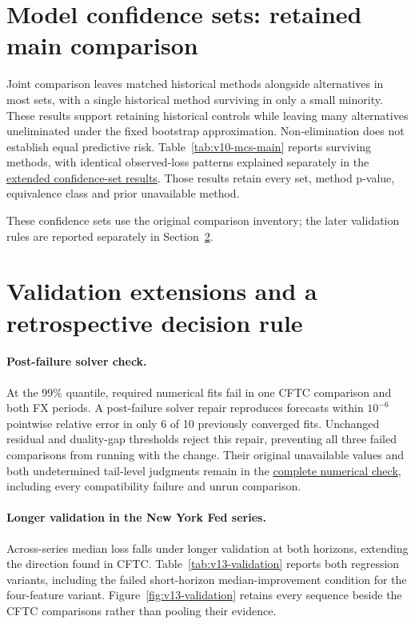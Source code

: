 \section{Model confidence sets: retained main comparison}\label{sup:v13-mcs}

Joint comparison leaves matched historical methods alongside alternatives in most sets, with a single historical method surviving in only a small minority. These results support retaining historical controls while leaving many alternatives uneliminated under the fixed bootstrap approximation. Non-elimination does not establish equal predictive risk. Table~\ref{tab:v10-mcs-main} reports surviving methods, with identical observed-loss patterns explained separately in the \href{https://github.com/ByronLi0207/financial-mathematics-paper-20261020/blob/submission-final/EXTENDED_RESULTS.md#asmbi-extended-s31}{extended confidence-set results}. Those results retain every set, method p-value, equivalence class and prior unavailable method.

These confidence sets use the original comparison inventory; the later validation rules are reported separately in Section~\ref{sup:v13-checks}.



\FloatBarrier
\section{Validation extensions and a retrospective decision rule}\label{sup:v13-checks}

\paragraph{Post-failure solver check.}
At the 99\% quantile, required numerical fits fail in one CFTC comparison and both FX periods. A post-failure solver repair reproduces forecasts within $10^{-6}$ pointwise relative error in only 6 of 10 previously converged fits. Unchanged residual and duality-gap thresholds reject this repair, preventing all three failed comparisons from running with the change. Their original unavailable values and both undetermined tail-level judgments remain in the \href{https://github.com/ByronLi0207/financial-mathematics-paper-20261020/tree/revision-v13/results/v13/tau-repair}{complete numerical check}, including every compatibility failure and unrun comparison.

\paragraph{Longer validation in the New York Fed series.}
Across-series median loss falls under longer validation at both horizons, extending the direction found in CFTC. Table~\ref{tab:v13-validation} reports both regression variants, including the failed short-horizon median-improvement condition for the four-feature variant. Figure~\ref{fig:v13-validation} retains every sequence beside the CFTC comparisons rather than pooling their evidence.

